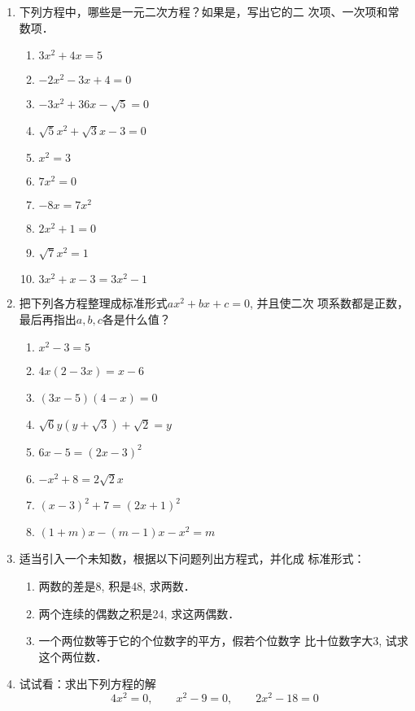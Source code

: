 \begin{ex}
\begin{enumerate}
    \item 
    下列方程中，哪些是一元二次方程？如果是，写出它的二
    次项、一次项和常数项．
    \begin{multicols}{2}
        \begin{enumerate}
       \item $3x^2+4x=5$
       \item $-2x^2-3x+4=0$
       \item $-3x^2+36x-\sqrt{5}=0$
       \item  $\sqrt{5}x^2+\sqrt{3}x-3=0$
           \item  $x^2=3$
       \item  $7x^2=0$
           \item  $ -8x=7x^2$
           \item  $2x^2+1=0$
       \item  $\sqrt{7}x^2=1$ 
       \item  $3x^2+x-3=3x^2-1$
   \end{enumerate}
    \end{multicols}
   
   \item 把下列各方程整理成标准形式$ax^2+bx+c=0$, 并且使二次
    项系数都是正数，最后再指出$a,b,c$各是什么值？
    \begin{multicols}{2}
  \begin{enumerate}
    \item  $x^2-3=5$
    \item $4x(2-3x)=x-6$
    \item $(3x-5)(4-x)=0$
    \item $\sqrt{6}y(y+\sqrt{3})+\sqrt{2}=y$
    \item $6x-5=(2x-3)^2$ 
    \item $-x^2+8=2\sqrt{2}x$
        \item $(x-3)^2+7=(2x+1)^2$
        \item $(1+m)x- (m-1)x-x^2=m$
\end{enumerate}      
    \end{multicols}

    \item 适当引入一个未知数，根据以下问题列出方程式，并化成
    标准形式：
    \begin{enumerate}
        \item 两数的差是8, 积是48, 求两数．
        \item 两个连续的偶数之积是24, 求这两偶数．
        \item 一个两位数等于它的个位数字的平方，假若个位数字
    比十位数字大3, 试求这个两位数．
    \end{enumerate}
\item 试试看：求出下列方程的解
\[4x^2=0,\qquad  x^2-9=0,\qquad 2x^2-18=0\]
\end{enumerate}    
\end{ex}


